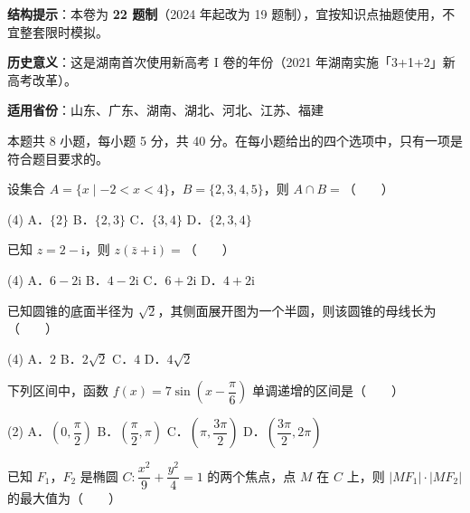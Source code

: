 

\begin{gknotice}
\textbf{结构提示}：本卷为 \textbf{22 题制}（2024 年起改为 19 题制），宜按知识点抽题使用，不宜整套限时模拟。

\textbf{历史意义}：这是湖南首次使用新高考 I 卷的年份（2021 年湖南实施「3+1+2」新高考改革）。

\textbf{适用省份}：山东、广东、湖南、湖北、河北、江苏、福建
\end{gknotice}

\par\medskip


\begin{gktip}
本题共 8 小题，每小题 5 分，共 40 分。在每小题给出的四个选项中，只有一项是符合题目要求的。
\end{gktip}

设集合 $A=\{x\mid-2<x<4\}$，$B=\{2,3,4,5\}$，则 $A\cap B=$（　　）

\begin{gkopts}(4)
\task A．$\{2\}$
\task B．$\{2,3\}$
\task C．$\{3,4\}$
\task D．$\{2,3,4\}$
\end{gkopts}

已知 $z=2-\mathrm i$，则 $z(\bar z+\mathrm i)=$（　　）

\begin{gkopts}(4)
\task A．$6-2\mathrm i$
\task B．$4-2\mathrm i$
\task C．$6+2\mathrm i$
\task D．$4+2\mathrm i$
\end{gkopts}

已知圆锥的底面半径为 $\sqrt2$，其侧面展开图为一个半圆，则该圆锥的母线长为（　　）

\begin{gkopts}(4)
\task A．$2$
\task B．$2\sqrt2$
\task C．$4$
\task D．$4\sqrt2$
\end{gkopts}

下列区间中，函数 $f(x)=7\sin\left(x-\dfrac\pi6\right)$ 单调递增的区间是（　　）

\begin{gkopts}(2)
\task A．$\left(0,\dfrac\pi2\right)$
\task B．$\left(\dfrac\pi2,\pi\right)$
\task C．$\left(\pi,\dfrac{3\pi}2\right)$
\task D．$\left(\dfrac{3\pi}2,2\pi\right)$
\end{gkopts}

已知 $F_1$，$F_2$ 是椭圆 $C:\dfrac{x^{2}}9+\dfrac{y^{2}}4=1$ 的两个焦点，点 $M$ 在 $C$ 上，则 $\left|MF_1\right|\cdot\left|MF_2\right|$ 的最大值为（　　）

